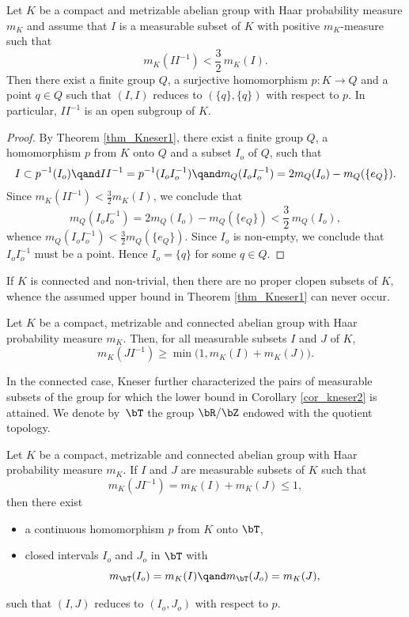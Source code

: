 \begin{corollary}
\label{cor_kneser1}
Let $K$ be a compact and metrizable abelian group with Haar probability measure $m_K$ and assume that $I$ is a measurable
subset of $K$ with positive $m_K$-measure such that
\[
m_K(II^{-1}) < \frac{3}{2}\, m_K(I).
\]
Then there exist a finite group $Q$, a surjective homomorphism $p : K \to Q$ and a point $q \in Q$ such that $(I,I)$ reduces
to $(\{q\},\{q\})$ with respect to $p$. In particular, $II^{-1}$ is an open subgroup of $K$.
\end{corollary}

\begin{proof}
By Theorem \ref{thm_Kneser1}, there exist a finite group $Q$, a homomorphism $p$ from $K$ onto $Q$ and
a subset $I_o$ of $Q$, such that
\[
I \subset p^{-1}(I_o) \qand II^{-1} = p^{-1}(I_o I_o^{-1}) \qand m_Q(I_o I_o^{-1}) = 2m_Q(I_o) - m_Q(\{e_Q\}).
\]
Since $m_K(II^{-1}) < \frac{3}{2} m_K(I)$, we conclude that
\begin{equation}
\label{Qbnd}
m_Q(I_o I_o^{-1}) = 2m_Q(I_o) - m_Q(\{e_Q\}) < \frac{3}{2}\, m_Q(I_o),
\end{equation}
whence $m_Q(I_o I_o^{-1}) < \frac{3}{2} m_Q(\{e_Q\})$. Since $I_o$ is non-empty, we conclude that $I_o I_o^{-1}$ must be a
point. Hence $I_o = \{q\}$ for some $q \in Q$.
\end{proof}

If $K$ is connected and non-trivial, then there are no proper clopen subsets of $K$, whence the assumed upper bound in Theorem \ref{thm_Kneser1}
can never occur.

\begin{corollary}
\label{cor_kneser2}
Let $K$ be a compact, metrizable and connected abelian group with Haar probability measure $m_K$. Then, for all measurable subsets
$I$ and $J$ of $K$,
\[
m_K(JI^{-1}) \geq \min\bigl(1,m_K(I) + m_K(J)\bigr).
\]
\end{corollary}

In the connected case, Kneser further characterized the pairs of measurable subsets of the group for which the lower bound in Corollary \eqref{cor_kneser2}
is attained. We denote by~$\bT$ the group $\bR/\bZ$ endowed with the quotient topology.

\begin{theorem}
\label{thm_Kneser2}
Let $K$ be a compact, metrizable and connected abelian group with Haar probability measure $m_K$. If $I$ and $J$ are measurable
subsets of $K$ such that
\[
m_K(JI^{-1}) = m_K(I) + m_K(J) \leq 1,
\]
then there exist

\begin{itemize}
\item a continuous homomorphism $p$ from $K$ onto $\bT$,
\item closed intervals $I_o$ and $J_o$ in $\bT$ with
\[
m_\bT(I_o) = m_K(I) \qand m_{\bT}(J_o) = m_{K}(J),
\]
\end{itemize}
such that $(I,J)$ reduces to $(I_o,J_o)$ with respect to $p$.
\end{theorem}

